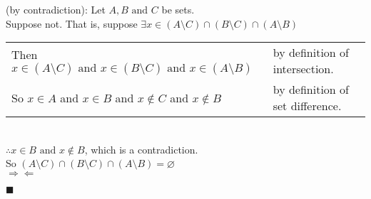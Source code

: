 \documentclass[12pt]{article}
\renewcommand{\qed}{\hfill$\blacksquare$}
\renewenvironment{proof}{\begin{addmargin}[1em]{0em}\begin{newproof}}{\end{newproof}\end{addmargin}\qed}
\begin{document}
\begin{proof}(by contradiction): Let $A, B \text{ and } C$ be sets. \\
	Suppose not. That is, suppose $\exists x \in (A\setminus C) \cap (B \setminus C) \cap (A\setminus B)$ \\
	\begin{tabular}{@{}ll@{}}
		Then $x \in (A \setminus C) \text{ and } x \in (B \setminus C) \text{ and } x \in (A \setminus B)$ & by definition of intersection.   \\
		So $x \in A$ and $x \in B$ and $x \notin C$ and $x \notin B$                                       & by definition of set difference.
	\end{tabular} \\
	$\therefore x \in B \text{ and } x \notin B$, which is a contradiction. \\
	So $(A\setminus C) \cap (B \setminus C) \cap (A\setminus B) = \varnothing$ \\
	$\Rightarrow\!\Leftarrow$
\end{proof}

\end{document}
